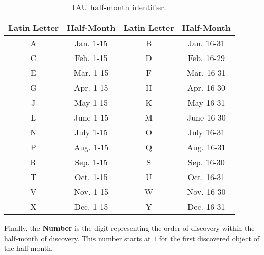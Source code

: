 \begin{table}[H]
  \centering
  \begin{tabular}{|c|c||c|c|}
    \hline
    \textbf{Latin Letter} & \textbf{Half-Month} & \textbf{Latin Letter} & \textbf{Half-Month} \\
    \hline
    A                     & Jan. 1-15           & B                     & Jan. 16-31          \\
    C                     & Feb. 1-15           & D                     & Feb. 16-29          \\
    E                     & Mar. 1-15           & F                     & Mar. 16-31          \\
    G                     & Apr. 1-15           & H                     & Apr. 16-30          \\
    J                     & May 1-15            & K                     & May 16-31           \\
    L                     & June 1-15           & M                     & June 16-30          \\
    N                     & July 1-15           & O                     & July 16-31          \\
    P                     & Aug. 1-15           & Q                     & Aug. 16-31          \\
    R                     & Sep. 1-15           & S                     & Sep. 16-30          \\
    T                     & Oct. 1-15           & U                     & Oct. 16-31          \\
    V                     & Nov. 1-15           & W                     & Nov. 16-30          \\
    X                     & Dec. 1-15           & Y                     & Dec. 16-31          \\
    \hline
  \end{tabular}
  \caption[IAU half-month identifier.]{IAU half-month identifier.}
  \label{tab:iau_half_month_id}
\end{table}

Finally, the \textbf{Number} is the digit representing the order of discovery
within the half-month of discovery. This number starts at $1$ for the first
discovered object of the half-month.
